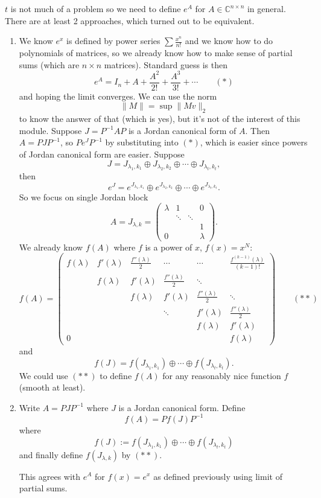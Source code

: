 \documentclass[a4paper]{article}
\theoremstyle{definition}
\begin{document}
$t$ is not much of a problem so we need to define $e^A$ for $A\in \mathbb C^{n\times n}$ in general. There are at least 2 approaches, which turned out to be equivalent.
\begin{enumerate}
    \item We know $e^x$ is defined by power series $\sum \frac{x^n}{n!}$ and we know how to do polynomials of matrices, so we already know how to make sense of partial sums (which are $n\times n$ matrices). Standard guess is then
\[
e^A=I_n+A+\frac{A^2}{2!}+\frac{A^3}{3!}+\cdots \qquad (\ast)
\]
and hoping the limit converges. We can use the norm
\[
\|M\|=\sup \|Mv\|_2
\]
to know the answer of that (which is yes), but it's not of the interest of this module.
    Suppose $J=P^{-1}AP$ is a Jordan canonical form of $A$. Then $A=PJP^{-1}$, so $Pe^JP^{-1}$ by substituting into $(\ast)$, which is easier since powers of Jordan canonical form are easier. Suppose
\[
J=J_{\lambda_1 ,k_1}\oplus J_{\lambda_2 ,k_2}\oplus \cdots \oplus J_{\lambda _t,k_t},
\]
then
\[
e^J=e^{J_{\lambda_1 ,k_1}}\oplus e^{J_{\lambda_2 ,k_2}}\oplus \cdots \oplus e^{J_{\lambda_t ,k_t}} .
\]
So we focus on single Jordan block
\[
A=J_{\lambda ,k}=\begin{pmatrix}\lambda & 1 & & 0 \\
& \ddots & \ddots & \\
&&& 1\\
0& & &\lambda
\end{pmatrix} .
\]
We already know $f(A)$ where $f$ is a power of $x$, $f(x)=x^N$:
\[
f(A)=\begin{pmatrix}
f(\lambda) &f'(\lambda)&\frac{f''(\lambda)}{2}&\cdots&\cdots&\frac{f^{(k-1)}(\lambda)}{(k-1)!}\\
&f(\lambda) &f'(\lambda)&\frac{f''(\lambda)}2&\ddots&\\
&&f(\lambda) &f'(\lambda)&\frac{f''(\lambda)}2&\ddots\\
&&&\ddots &f'(\lambda)&\frac{f''(\lambda)}2\\
&&&&f(\lambda) &f'(\lambda)\\
0&&&&&f(\lambda)
\end{pmatrix} \qquad (\ast\ast)
\]
and
\[
f(J)=f(J_{\lambda _1,k_1})\oplus \cdots \oplus f(J_{\lambda _t,k_t}).
\]
We could use $(\ast\ast)$ to define $f(A)$ for any reasonably nice function $f$ (smooth at least).

\item Write $A=PJP^{-1}$ where $J$ is a Jordan canonical form. Define
\[
f(A)=Pf(J)P^{-1}
\]
where
\[
f(J):=f(J_{\lambda _1,k_1})\oplus \cdots \oplus f(J_{\lambda _t,k_t})
\]
and finally define $f(J_{\lambda ,k})$ by $(\ast\ast)$.

This agrees with $e^A$ for $f(x)=e^x$ as defined previously using limit of partial sums.
\end{enumerate}
\end{document}

